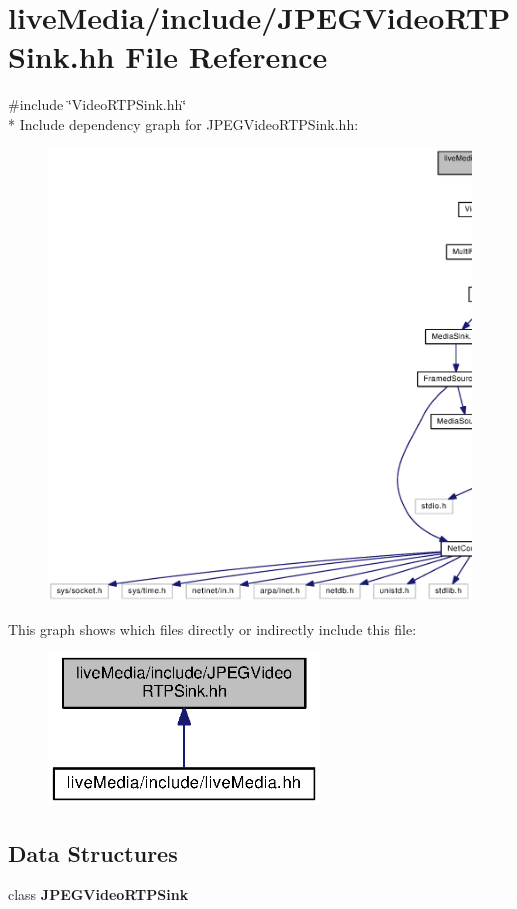 \section{live\+Media/include/\+J\+P\+E\+G\+Video\+R\+T\+P\+Sink.hh File Reference}
\label{JPEGVideoRTPSink_8hh}
{\ttfamily \#include \char`\"{}Video\+R\+T\+P\+Sink.\+hh\char`\"{}}\\*
Include dependency graph for J\+P\+E\+G\+Video\+R\+T\+P\+Sink.\+hh\+:
\nopagebreak
\begin{figure}[H]
\begin{center}
\leavevmode
\includegraphics[width=350pt]{JPEGVideoRTPSink_8hh__incl}
\end{center}
\end{figure}
This graph shows which files directly or indirectly include this file\+:
\nopagebreak
\begin{figure}[H]
\begin{center}
\leavevmode
\includegraphics[width=204pt]{JPEGVideoRTPSink_8hh__dep__incl}
\end{center}
\end{figure}
\subsection*{Data Structures}
\begin{DoxyCompactItemize}
\item 
class {\bf J\+P\+E\+G\+Video\+R\+T\+P\+Sink}
\end{DoxyCompactItemize}
